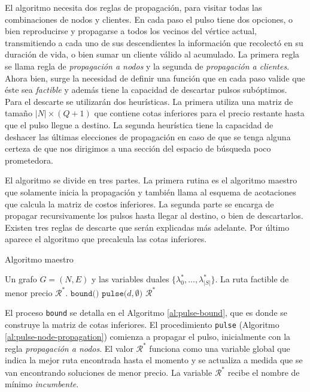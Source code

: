 El algoritmo necesita dos reglas de propagación, para visitar todas las combinaciones de nodos y clientes. En cada paso el pulso tiene dos opciones, o bien reproducirse y propagarse a todos los vecinos del vértice actual, transmitiendo a cada uno de sus descendientes la información que recolectó en su duración de vida, o bien sumar un cliente válido al acumulado. La primera regla se llama regla de \emph{propagación a nodos} y la segunda de \emph{propagación a clientes}. Ahora bien, surge la necesidad de definir una función que en cada paso valide que éste sea \emph{factible} y además tiene la capacidad de descartar pulsos subóptimos. Para el descarte se utilizarán dos heurísticas. La primera utiliza una matriz de tamaño $|N| \times (Q+1)$ que contiene cotas inferiores para el precio restante hasta que el pulso llegue a destino. La segunda heurística tiene la capacidad de deshacer las últimas elecciones de propagación en caso de que se tenga alguna certeza de que nos dirigimos a una sección del espacio de búsqueda poco prometedora.  

El algoritmo se divide en tres partes. La primera rutina es el algoritmo maestro que solamente inicia la propagación y también llama al esquema de acotaciones que calcula la matriz de costos inferiores. La segunda parte se encarga de propagar recursivamente los pulsos hasta llegar al destino, o bien de descartarlos. Existen tres reglas de descarte que serán explicadas más adelante. Por último aparece el algoritmo que precalcula las cotas inferiores.

\begin{algorithm}[H]
  \caption{Algoritmo maestro}
  \label{al:pulse-master}
  \begin{algorithmic}[1]
  	\Require Un grafo $G = (N, E)$ y las variables duales $\{\lambda^*_0, \dots, \lambda^*_{|S|}\}$.
  	\Ensure La ruta factible de menor precio $\mathscr{R}^{*}$.
        \State $\texttt{bound()}$
        \State $\texttt{pulse(} d, \emptyset \texttt{)}$
	\Return $\mathscr{R}^{*}$
  \end{algorithmic}
\end{algorithm}

El proceso \texttt{bound} se detalla en el Algoritmo \ref{al:pulse-bound}, que es donde se construye la matriz de cotas inferiores. El procedimiento \texttt{pulse} (Algoritmo \ref{al:pulse-node-propagation}) comienza a propagar el pulso, inicialmente con la regla \emph{propagación a nodos}. El valor $\mathscr{R}^{*}$ funciona como una variable global que indica la mejor ruta encontrada hasta el momento y se actualiza a medida que se van encontrando soluciones de menor precio. La variable $\mathscr{R}^{*}$ recibe el nombre de mínimo \emph{incumbente}. 

